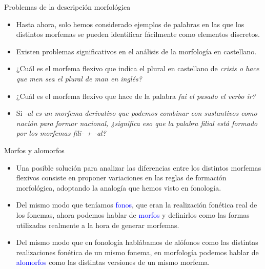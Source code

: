 \documentclass{beamer}
\begin{document}
\begin{frame}{Problemas de la descripción morfológica}

\begin{itemize}
	\item Hasta ahora, solo hemos considerado ejemplos de palabras en las que los distintos morfemas se pueden identificar fácilmente como elementos discretos.
	\item Existen problemas significativos en el análisis de la morfología en castellano.
	\item ¿Cuál es el morfema flexivo que indica el plural en castellano de \it{crisis} o hace que \it{men} sea el plural de \it{man} en inglés?
	\item ¿Cuál es el morfema flexivo que hace de la palabra \it{fui} el pasado el verbo \it{ir}?
	\item Si \it{-al} es un morfema derivativo que podemos combinar con sustantivos como \it{nación} para formar \it{nacional}, ¿significa eso que la palabra \it{filial} está formado por los morfemas \it{fili- + -al}? 
\end{itemize}

\end{frame}

\begin{frame}{Morfos y alomorfos}

\begin{itemize}
	\item Una posible solución para analizar las diferencias entre los distintos morfemas flexivos consiste en proponer variaciones en las reglas de formación morfológica, adoptando la analogía que hemos visto en fonología.
	\item Del mismo modo que teníamos \textcolor{blue}{fonos}, que eran la realización fonética real de los fonemas, ahora podemos hablar de \textcolor{blue}{morfos} y definirlos como las formas utilizadas realmente a la hora de generar morfemas.
	\item Del mismo modo que en fonología hablábamos de alófonos como las distintas realizaciones fonética de un mismo fonema, en morfología podemos hablar de \textcolor{blue}{alomorfos} como las distintas versiones de un mismo morfema.
\end{itemize}

\end{frame}
\end{document}

